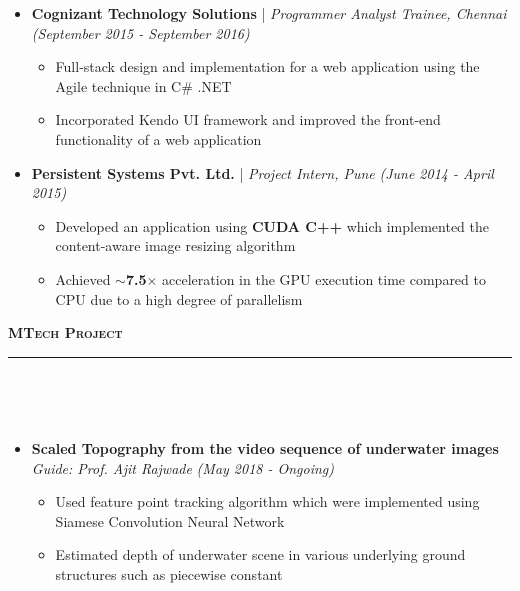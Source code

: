 \documentclass[a4paper,10pt]{article}
\newcommand{\isep}{-2 pt}
\newcommand{\resheading}[1]{{\small
        {
            \begin{minipage}
                {0.992\textwidth}\textbf{{\textsc{#1 \vphantom{p\^{E}} }}}
                \\[-0.3cm]
                \hrule
            \end{minipage}
            \\[-0.5cm]
        }
 }}
\begin{document}
\begin{itemize}
    \item \textbf{Cognizant Technology Solutions} |
    \emph{Programmer Analyst Trainee, Chennai} \hfill {\emph{(September 2015 - September 2016)}}
    \\ [-0.6cm]
    \begin{itemize}\itemsep \isep
    \item Full-stack design and implementation for a web application using the Agile technique in C\# .NET 
    \vspace{0.06cm}
    \item Incorporated Kendo UI framework and improved the front-end functionality of a web application
 \\ [-0.6cm]
    \end{itemize}
    \item \textbf{Persistent Systems Pvt. Ltd.} |
    \emph{Project Intern, Pune} \hfill {\emph{(June 2014 - April 2015)}}
    \\[-0.6cm]
    \begin{itemize}\itemsep \isep
    \item Developed an application  using \textbf{CUDA C++} which implemented the content-aware image resizing algorithm
    \vspace{-0.375cm}
    \item Achieved \textbf{$\sim$7.5$\times$} acceleration in the GPU execution time compared to CPU due to a high degree of parallelism
    \\ [-0.5 cm]
    \end{itemize}
\end{itemize}
\resheading{\textbf{\large MTech Project}}\\[-0.4cm] 
\begin{itemize}
\item \textbf{Scaled Topography from the video sequence of underwater images}  \\
    \emph{Guide: Prof. Ajit Rajwade} \hfill {\emph{(May 2018 - Ongoing)}}
    \\ [-0.6cm]
      \begin{itemize}\itemsep \isep
        \item Used feature point tracking algorithm which were implemented using Siamese Convolution Neural Network
        \vspace{-0.375cm}
        \item Estimated depth of underwater scene in various underlying ground structures such as piecewise constant
    \\ [-0.6cm]
      \end{itemize}
\end{itemize}
\end{document}
